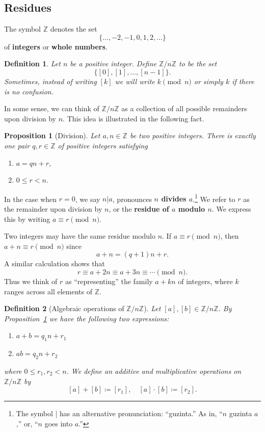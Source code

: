 \documentclass{article}
\newcommand{\blue}[1]{ {\color{blue}{#1}} }
\newcommand{\Z}{\mathbb{Z}}
\theoremstyle{plain}
\newtheorem{definition}{Definition}
\newtheorem{proposition}{Proposition}
\begin{document}
\subsection{Residues}

The symbol $\Z$ denotes the set
\[
    \{ \dots, -2, -1, 0, 1, 2, \dots\}
\]
of \textbf{integers} or \textbf{whole numbers}.

\begin{definition}
    Let $n$ be a positive integer.
    Define $\Z/n\Z$ to be the set 
    \[
        \{ [0], [1], \dots, [n-1] \}.
    \]
    Sometimes, instead of writing $[k]$ we will write $k\pmod{n}$
    or simply $k$ if there is no confusion.
\end{definition}

In some sense, we can think of $\Z/n\Z$ as a collection of all possible 
remainders upon division by $n$.
This idea is illustrated in the following fact.

\begin{proposition}[Division]\label{prop:div}
    Let $a,n \in \Z$ be two positive integers.
    There is exactly one pair $q,r\in\Z$ of positive integers satisfying 
    \begin{enumerate}
        \item $a = qn+r$,
        \item $0\leq r < n$.
    \end{enumerate}
\end{proposition}

\blue{
\begin{proof}
    To do.
\end{proof}
}

In the case when $r=0$, we say $n|a$, pronounces \textbf{$n$ divides $a$}.\footnote{
    The symbol $|$ has an alternative pronunciation: ``guzinta.''
As in, ``$n$ guzinta $a$,'' or, ``$n$ goes into $a$.''}
We refer to $r$ as the remainder upon division by $n$, or 
the \textbf{residue of $a$ modulo $n$}.
We express this by writing $a \equiv r \pmod{n}$.

Two integers may have the same residue modulo $n$.
If $a \equiv r \pmod{n}$, then $a+n \equiv r \pmod{n}$ since 
\[ 
    a+n = (q+1)n + r.
\] 
A similar calculation shows that
\[
    r \equiv a+2n \equiv a+3n \equiv \cdots \pmod{n}.
\]
Thus we think of $r$ as ``representing'' the family $a+kn$ of integers, where $k$
ranges across all elements of $\Z$.



\begin{definition}[Algebraic operations of $\Z/n\Z$]
    Let $[a], [b] \in \Z/n\Z$.
    By Proposition~\ref{prop:div} we have the following two expressions:
    \begin{enumerate}
        \item $a+b = q_1 n + r_1$
        \item $ab = q_2 n + r_2$
    \end{enumerate}
    where $0\leq r_1,r_2 < n$.
    We define an additive and multiplicative operations on $\Z/n\Z$ by 
    \[  
        [a]+[b] \coloneq [r_1], \quad [a] \cdot [b] \coloneq [r_2].
    \]
\end{definition}
\end{document}

